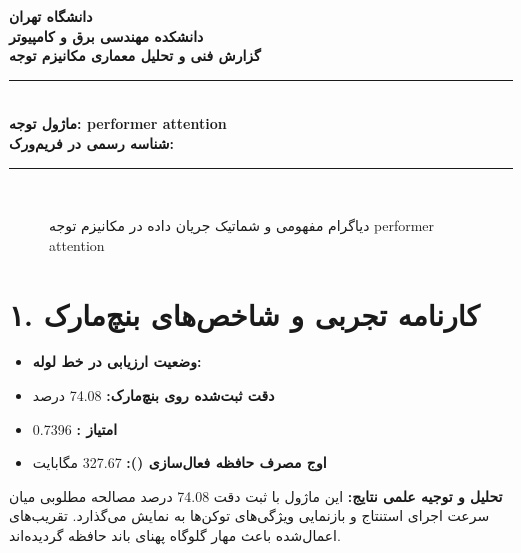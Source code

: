 \documentclass[12pt,a4paper]{article}
\begin{document}
\begin{center}
{\Large\bfseries دانشگاه تهران}\\[0.2cm]
{\large\bfseries دانشکده مهندسی برق و کامپیوتر}\\[0.2cm]
{\large\bfseries گزارش فنی و تحلیل معماری مکانیزم توجه}\\[0.5cm]
\rule{\linewidth}{1pt}\\[0.3cm]
{\LARGE\bfseries ماژول توجه: performer attention}\\[0.2cm]
{\large \textbf{شناسه رسمی در فریم‌ورک:} }\\[0.2cm]
\rule{\linewidth}{1pt}\\[0.5cm]
\end{center}

\begin{figure}[H]
\centering
{}
\caption{دیاگرام مفهومی و شماتیک جریان داده در مکانیزم توجه performer attention}
\end{figure}

\section*{۱. کارنامه تجربی و شاخص‌های بنچ‌مارک}
\begin{itemize}
\item \textbf{وضعیت ارزیابی در خط لوله:} 
\item \textbf{دقت ثبت‌شده روی بنچ‌مارک:} 74.08 درصد
\item \textbf{امتیاز :} 0.7396
\item \textbf{اوج مصرف حافظه فعال‌سازی ():} 327.67 مگابایت
\end{itemize}
\textbf{تحلیل و توجیه علمی نتایج:} این ماژول با ثبت دقت 74.08 درصد مصالحه مطلوبی میان سرعت اجرای استنتاج و بازنمایی ویژگی‌های توکن‌ها به نمایش می‌گذارد. تقریب‌های اعمال‌شده باعث مهار گلوگاه پهنای باند حافظه گردیده‌اند.
\end{document}
